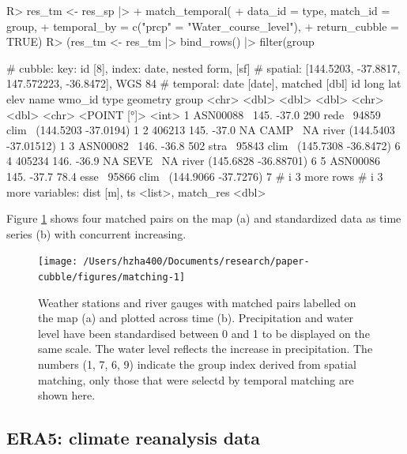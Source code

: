 \documentclass[
  shortnames]{jss}
\begin{document}
\begin{CodeChunk}
\begin{CodeInput}
R> res_tm <- res_sp |> 
+   match_temporal(
+     data_id = type, match_id = group,
+     temporal_by = c("prcp" = "Water_course_level"),
+     return_cubble = TRUE)
R> (res_tm <- res_tm |> bind_rows() |> filter(group %
\end{CodeInput}
\begin{CodeOutput}
# cubble:   key: id [8], index: date, nested form, [sf]
# spatial:  [144.5203, -37.8817, 147.572223, -36.8472], WGS 84
# temporal: date [date], matched [dbl]
  id         long   lat  elev name  wmo_id type              geometry group
  <chr>     <dbl> <dbl> <dbl> <chr>  <dbl> <chr>          <POINT [°]> <int>
1 ASN00088~  145. -37.0 290   rede~  94859 clim~  (144.5203 -37.0194)     1
2 406213     145. -37.0  NA   CAMP~     NA river (144.5403 -37.01512)     1
3 ASN00082~  146. -36.8 502   stra~  95843 clim~  (145.7308 -36.8472)     6
4 405234     146. -36.9  NA   SEVE~     NA river (145.6828 -36.88701)     6
5 ASN00086~  145. -37.7  78.4 esse~  95866 clim~  (144.9066 -37.7276)     7
# i 3 more rows
# i 3 more variables: dist [m], ts <list>, match_res <dbl>
\end{CodeOutput}
\end{CodeChunk}

Figure \ref{fig:matching} shows four matched pairs on the map (a) and standardized data as time series (b) with concurrent increasing.

\begin{CodeChunk}
\begin{figure}

{\centering \texttt{[image: /Users/hzha400/Documents/research/paper-cubble/figures/matching-1]} 

}

\caption[Weather stations and river gauges with matched pairs labelled on the map (a) and plotted across time (b)]{Weather stations and river gauges with matched pairs labelled on the map (a) and plotted across time (b). Precipitation and water level have been standardised between 0 and 1 to be displayed on the same scale. The water level reflects the increase in precipitation. The numbers (1, 7, 6, 9) indicate the group index derived from spatial matching, only those that were selectd by temporal matching are shown here.}\label{fig:matching}
\end{figure}
\end{CodeChunk}

\hypertarget{era5-climate-reanalysis-data}{%
\subsection{ERA5: climate reanalysis data}\label{era5-climate-reanalysis-data}}
\end{document}
